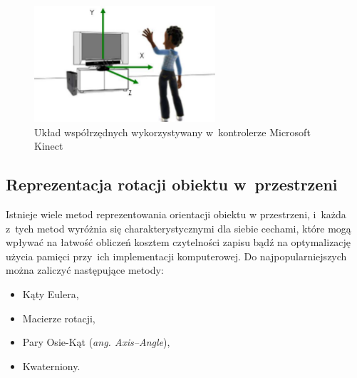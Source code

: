 \begin{savenotes}
	\begin{figure}
		\centering
		\includegraphics[width=0.6\textwidth]{images/skeletonSpace.png}
		\caption[Układ współrzędnych wykorzystywany w~kontrolerze Microsoft Kinect]{Układ współrzędnych wykorzystywany w~kontrolerze Microsoft Kinect }
		\label{fig:characteristics:kinect:space}
	\end{figure}
\end{savenotes}
																											
																									
\subsection{Reprezentacja rotacji obiektu w~przestrzeni}\label{chap:orientstionRep}
Istnieje wiele metod reprezentowania orientacji obiektu w przestrzeni, i~każda z~tych metod wyróżnia się charakterystycznymi dla siebie cechami, które mogą wpływać na łatwość obliczeń kosztem czytelności zapisu bądź na optymalizację użycia pamięci przy~ich implementacji komputerowej. Do najpopularniejszych można zaliczyć następujące metody:
																										
\begin{itemize}
	\item Kąty Eulera,
	\item Macierze rotacji,
	\item Pary Osie-Kąt (\emph{ang. Axis--Angle}),
	\item Kwaterniony.
\end{itemize} 
																											
